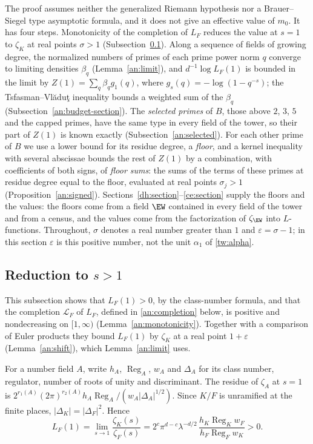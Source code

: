 The proof assumes neither the generalized Riemann hypothesis nor a
Brauer--Siegel type asymptotic formula, and it does not give an effective
value of $m_0$. It has four steps. Monotonicity of the completion of $L_F$
reduces the value at $s=1$ to $\zeta_K$ at real points $\sigma>1$
(Subsection~\ref{an:reduction}). Along a sequence of fields of growing
degree, the normalized numbers of primes of each prime power norm $q$
converge to limiting densities $\beta_q$ (Lemma~\ref{an:limit}), and
$d^{-1}\log L_F(1)$ is bounded in the limit by $Z(1)=\sum_q\beta_qg_1(q)$,
where $g_s(q)=-\log(1-q^{-s})$; the Tsfasman--Vl\u{a}du\c{t} inequality
bounds a weighted sum of the $\beta_q$ (Subsection~\ref{an:budget-section}).
The \emph{selected primes} of $B$, those above $2$, $3$, $5$ and the capped
primes, have the same type in every field of the tower, so their part of
$Z(1)$ is known exactly (Subsection~\ref{an:selected}). For each other prime
of $B$ we use a lower bound for its residue degree, a \emph{floor}, and a
kernel inequality with several abscissae bounds the rest of $Z(1)$ by a
combination, with coefficients of both signs, of \emph{floor sums}: the sums
of the terms of these primes at residue degree equal to the floor, evaluated
at real points $\sigma_j>1$ (Proposition~\ref{an:signed}).
Sections~\ref{dh:section}--\ref{ce:section} supply the floors and the
values: the floors come from a field $\EW$ contained in every field of the
tower and from a census, and the values come from the factorization of
$\zeta_{\EW}$ into $L$-functions. Throughout, $\sigma$ denotes a real number
greater than $1$ and $\varepsilon=\sigma-1$; in this section $\varepsilon$ is
this positive number, not the unit $\alpha_1$ of \eqref{tw:alpha}.

\subsection{\texorpdfstring{Reduction to $s>1$}{Reduction to s > 1}}
\label{an:reduction}
This subsection shows that $L_F(1)>0$, by the class-number formula, and that
the completion $\mathcal L_F$ of $L_F$, defined in \eqref{an:completion}
below, is positive and nondecreasing on
$[1,\infty)$ (Lemma~\ref{an:monotonicity}). Together with a comparison of
Euler products they bound $L_F(1)$ by $\zeta_K$ at a real point
$1+\varepsilon$ (Lemma~\ref{an:shift}), which Lemma~\ref{an:limit} uses.

For a number field $A$, write $h_A$, $\operatorname{Reg}_A$, $w_A$ and
$\Delta_A$ for its class number, regulator, number of roots of unity and
discriminant. The residue of $\zeta_A$ at $s=1$ is
$2^{r_1(A)}(2\pi)^{r_2(A)}h_A\operatorname{Reg}_A/(w_A|\Delta_A|^{1/2})$.
Since $K/F$ is unramified at the finite places, $|\Delta_K|=|\Delta_F|^2$.
Hence
\begin{equation}\label{an:class-formula}
 L_F(1)=\lim_{s\to1}\frac{\zeta_K(s)}{\zeta_F(s)}
 =2^c\pi^{d-c}\lambda^{-d/2}\,
 \frac{h_K\operatorname{Reg}_Kw_F}{h_F\operatorname{Reg}_Fw_K}>0.
\end{equation}

